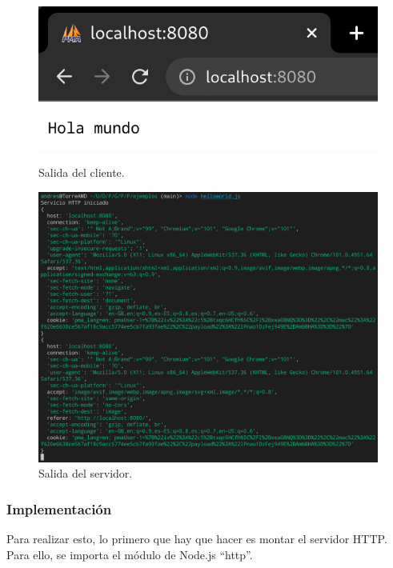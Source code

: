 \documentclass{article}
\begin{document}
\begin{figure}[H]
    \centering
    \begin{minipage}[H]{0.49\textwidth}
        \centering
        \includegraphics[width=\textwidth]{images/helloworldC.png}
        \caption{Salida del cliente.}
    \end{minipage}
    \hfill
    \begin{minipage}[H]{0.49\textwidth}
        \centering
        \includegraphics[width=\textwidth]{images/helloworldS.png}
        \caption{Salida del servidor.}
    \end{minipage}
\end{figure}

\subsubsection{Implementación}
Para realizar esto, lo primero que hay que hacer es montar el servidor HTTP. Para ello, se importa el módulo de Node.js ``http''.
\end{document}
